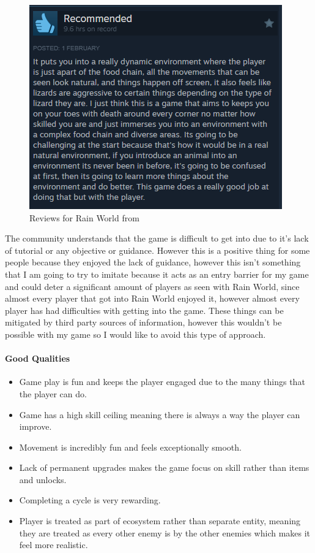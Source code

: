 \documentclass{article}
\begin{document}
\begin{figure}[h]
\begin{minipage}{0.4\linewidth}
\includegraphics[width=\linewidth]{Rain World review 3}
\end{minipage}
\caption{Reviews for Rain World from \cite{RWss}}
\label{rain world reviews}
\end{figure}

The community understands that the game is difficult to get into due to it's lack of tutorial or any objective or guidance. However this is a positive thing for some people because they enjoyed the lack of guidance, however this isn't something that I am going to try to imitate because it acts as an entry barrier for my game and could deter a significant amount of players as seen with Rain World, since almost every player that got into Rain World enjoyed it, however almost every player has had difficulties with getting into the game. These things can be mitigated by third party sources of information, however this wouldn't be possible with my game so I would like to avoid this type of approach.

\paragraph{Good Qualities}
\begin{itemize}
\item Game play is fun and keeps the player engaged due to the many things that the player can do.
\item Game has a high skill ceiling meaning there is always a way the player can improve.
\item Movement is incredibly fun and feels exceptionally smooth. 
\item Lack of permanent upgrades makes the game focus on skill rather than items and unlocks.
\item Completing a cycle is very rewarding.
\item Player is treated as part of ecosystem rather than separate entity, meaning they are treated as every other enemy is by the other enemies which makes it feel more realistic.
\end{itemize}
\end{document}
